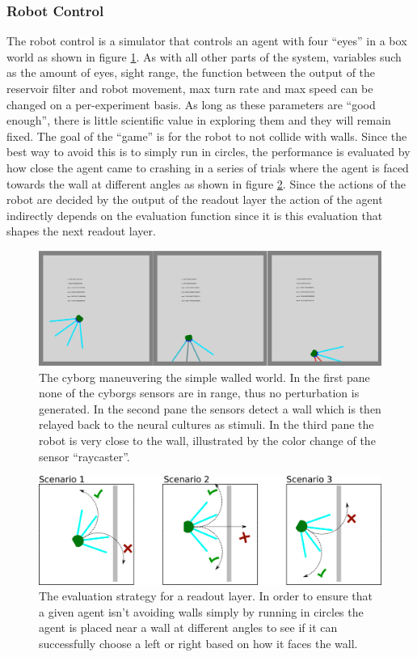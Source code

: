 \subsubsection{Robot Control}
The robot control is a simulator that controls an agent with four ``eyes'' in a box
world as shown in figure \ref{figGame}.
As with all other parts of the system, variables such as the amount of eyes, sight
range, the function between the output of the reservoir filter and robot
movement, max turn rate and max speed can be changed on a per-experiment basis.
As long as these parameters are ``good enough'', there is little scientific
value in exploring them and they will remain fixed.
The goal of the ``game'' is for the robot to not collide with walls.
Since the best way to avoid this is to simply run in circles, the performance is
evaluated by how close the agent came to crashing in a series of trials where
the agent is faced towards the wall at different angles as shown in figure \ref{challenges}.
Since the actions of the robot are decided by the output of the readout layer
the action of the agent indirectly depends on the evaluation function since it
is this evaluation that shapes the next readout layer.
\begin{figure}[h!]
  \centering
  \includegraphics[width=1\textwidth]{fig/TAC/game2.png}
  \caption[The agent in its box world]{
    The cyborg maneuvering the simple walled world. In the first pane none of
    the cyborgs sensors are in range, thus no perturbation is generated.
    In the second pane the sensors detect a wall which is then relayed back to
    the neural cultures as stimuli.
    In the third pane the robot is very close to the wall, illustrated by the
    color change of the sensor ``raycaster''.
  }
  \label{figGame}
\end{figure}
\begin{figure}[h!]
  \centering
  \includegraphics[width=1\textwidth]{fig/challenges.png}
  \caption[Evaluation strategy for agent performance]{
    The evaluation strategy for a readout layer.
    In order to ensure that a given agent isn't avoiding walls simply by running
    in circles the agent is placed near a wall at different angles to see if it
    can successfully choose a left or right based on how it faces the wall.
  }
  \label{challenges}
\end{figure}
